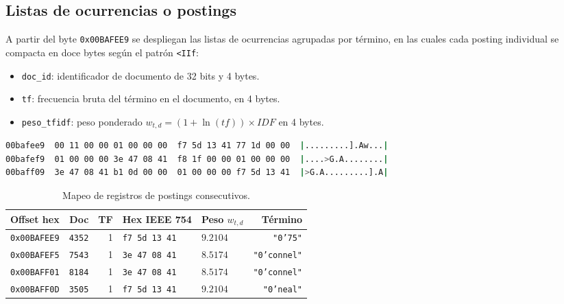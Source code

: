 \documentclass[11pt,spanish]{article}
\begin{document}
\subsection{Listas de ocurrencias o postings}

A partir del byte \texttt{0x00BAFEE9} se despliegan las listas de ocurrencias agrupadas por término, en las cuales cada posting individual se compacta en doce bytes según el patrón \texttt{<IIf}:
\begin{itemize}
    \item \texttt{doc\_id}: identificador de documento de 32 bits y 4 bytes.
    \item \texttt{tf}: frecuencia bruta del término en el documento, en 4 bytes.
    \item \texttt{peso\_tfidf}: peso ponderado $w_{t,d} = (1 + \ln(tf)) \times IDF$ en 4 bytes.
\end{itemize}

\begin{lstlisting}[language=bash, caption={Volcado de la lista de ocurrencias mediante \texttt{hexdump}.}]
00bafee9  00 11 00 00 01 00 00 00  f7 5d 13 41 77 1d 00 00  |.........].Aw...|
00bafef9  01 00 00 00 3e 47 08 41  f8 1f 00 00 01 00 00 00  |....>G.A........|
00baff09  3e 47 08 41 b1 0d 00 00  01 00 00 00 f7 5d 13 41  |>G.A.........].A|
\end{lstlisting}

\begin{table}[htbp]
  \centering
  \small
  \caption{Mapeo de registros de postings consecutivos.}
  \label{tab:postings-binarios}
  \begin{tabular*}{\linewidth}{@{\extracolsep{\fill}}lrrllr@{}}
    \toprule
    \textbf{Offset hex} & \textbf{Doc} & \textbf{TF} & \textbf{Hex IEEE 754} & \textbf{Peso $w_{t,d}$} & \textbf{Término} \\
    \midrule
    \texttt{0x00BAFEE9} & \texttt{4352} & 1 & \texttt{f7 5d 13 41} & $9.2104$ & \texttt{"0'75"} \\
    \texttt{0x00BAFEF5} & \texttt{7543} & 1 & \texttt{3e 47 08 41} & $8.5174$ & \texttt{"0'connel"} \\
    \texttt{0x00BAFF01} & \texttt{8184} & 1 & \texttt{3e 47 08 41} & $8.5174$ & \texttt{"0'connel"} \\
    \texttt{0x00BAFF0D} & \texttt{3505} & 1 & \texttt{f7 5d 13 41} & $9.2104$ & \texttt{"0'neal"} \\
    \bottomrule
  \end{tabular*}
\end{table}
\end{document}
